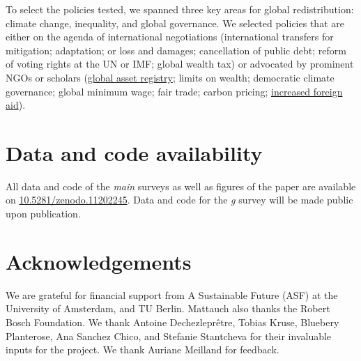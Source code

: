 \begin{bibunit}
\begin{small}
To select the policies tested, we spanned three key areas for global redistribution: climate change, inequality, and global governance. We selected policies that are either on the agenda of international negotiations (international transfers for mitigation; adaptation; or loss and damages; cancellation of public debt; reform of voting rights at the UN or IMF; global wealth tax) or advocated by prominent NGOs or scholars (\href{https://static1.squarespace.com/static/5a0c602bf43b5594845abb81/t/5c988368eef1a1538c2ae7eb/1553498989927/GAR.pdf}{global asset registry}; limits on wealth;\citep{robeyns_limitarianism_2024,piketty_brief_2022} democratic climate governance;\citep{dryzek_global_2011} global minimum wage;\citep{palley_financial_2013} fair trade;\citep{hickel_divide_2017} carbon pricing;\citep{cramton_global_2017} \href{https://concordeurope.org/wp-content/uploads/2019/11/CONCORD_AidWatch_Report_2019_web.pdf}{increased foreign aid}).



\section*{\normalsize Data and code availability}

All data and code of the \textit{main} surveys as well as figures of the paper are available on \href{https://zenodo.org/doi/10.5281/zenodo.11202245}{10.5281/zenodo.11202245}. %
Data and code for the \textit{g} survey will be made public upon publication. %

\section*{\normalsize Acknowledgements}

We are grateful for financial support from A Sustainable Future (ASF) at the University of Amsterdam, and TU Berlin. Mattauch also thanks the Robert Bosch Foundation. %
We thank Antoine Dechezleprêtre, Tobias Kruse, Bluebery Planterose, Ana Sanchez Chico, and Stefanie Stantcheva for their invaluable inputs for the project. We thank Auriane Meilland for feedback. %


\end{small}
\end{bibunit}
